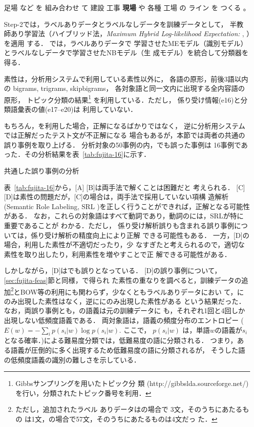 \documentclass[japanese]{jnlp_1.4}
\newcommand{\WSD}{}
\newcommand{\MHLE}{}
\newcommand{\COR}{}
\newcommand{\SYS}{}
\newcommand{\SF}{}
\newcommand{\ulf}{}
\newcommand{\eid}[1]{}
\begin{document}
 \begin{exe}
 \ex \label{s:genba}
 足場 など を 組み合わせ て 建設 \ulf{工事 {\bf 現場}} や 各種 工場 の ライン を つくる 。
 \end{exe}

Step-2では，ラベルありデータとラベルなしデータを訓練データとして，
半教師あり学習法（ハイブリッド法，{\it Maximum Hybrid
Log-likelihood Expectation:} \MHLE, \cite{Fujino:Ueda:Nagata:2010}）を適用
する．
\MHLE{}では，ラベルありデータで
学習させたMEモデル（識別モデル）とラベルなしデータで学習させたNBモデル（生
成モデル）を統合して分類器を得る．

素性は，分析用システムで利用している素性以外に，
各語の原形，前後3語以内の
bigrams, trigrams, skipbigrams，
各対象語と同一文内に出現する全内容語の原形，
トピック分類の結果\footnote{Gibbsサンプリングを用いたトピック分
類 (http://gibbslda.sourceforge.net/) を行い，分類されたトピック番号を利用．}
を利用している．ただし，
係り受け情報(e16)と分類語彙表の値(e17--e20)は
利用していない．

もちろん，\SF{}を利用した場合，正解になるばかりではなく，
逆に分析用システムでは正解だったテスト文が不正解になる
場合もあるが，本節では両者の共通の誤り事例を取り上げる．
分析対象の50事例の内，\SF{}でも誤った事例は 16事例であった．その分析結果を表~\ref{tab:fujita-16}に示す．

\begin{table}[b]
\caption{共通した誤り事例の分析}
\label{tab:fujita-16}\small

\end{table}

表~\ref{tab:fujita-16}から，[A] [B]は両手法で解くことは困難だと
考えられる．
[C][D]は素性の問題だが，[C]の場合は，両手法で採用していない項構
造解析(Semantic Role Labeling, SRL \cite{srl})を正しく行うことができれば，正解となる可能性がある．
なお，これらの対象語はすべて動詞であり，動詞の\WSD{}には，SRLが特に重要であることが
わかる．ただし，
係り受け解析誤りも含まれる誤り事例については，係り受け解析の精度向上により正解
できる可能性もある．
一方，[D]の場合，利用した素性が不適切だったり，少
なすぎたと考えられるので，適切な素性を取り出したり，利用素性を増やすことで正
解できる可能性がある．


しかしながら，[D]は\SF{}でも誤りとなっている．
[D]の誤り事例について，
\pagebreak
\ref{sec:fujita-feas}節と同様，\SF{}で得られ
た素性の重なりを調べると，訓練データの追加\footnote{ただし，追加されたラベル
  ありデータは\eid{39}の場合で 3文，そのうち\COR{}にあたるもの
  は1文，\eid{41}の場合で57文，そのうち\COR{}にあたるものは4文だっ
  た．}とBOW等の利用にも関わらず，少なくともラベルありデータにおい
て，\COR{}にのみ出現した素性はなく，逆に\SYS{}にのみ出現した素性がある
という結果だった．なお，両誤り事例とも，\COR{}の語義は元の訓練データに
も，それぞれ1回と4回しか出現しない低頻度語義である．
両対象語は，語義の頻度分布のエントロピー
 ($E(w) = - \sum_{i}^{} p(s_{i}|w) \log {p(s_{i}|w)}$. ここで， $p(s_{i}|w)$ は，単語$w$の語義が$s_i$となる確率．\cite{Shirai:2003j})による難易度分類では，低難易度の語に分類される．
つまり，ある語義が圧倒的に多く出現するため低難易度の語に分類されるが，
そうした語の低頻度語義の識別の難しさを示している．
\end{document}

